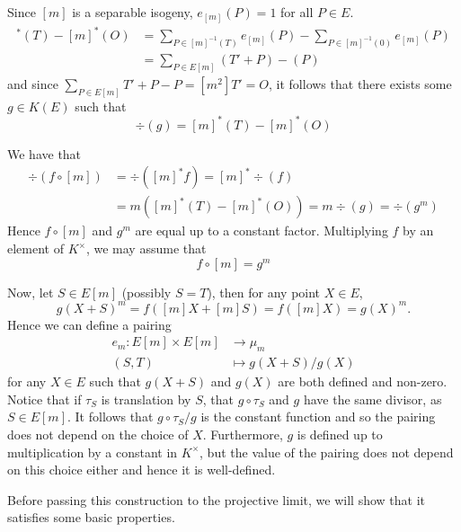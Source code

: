 Since $[m]$ is a separable isogeny, $e_{[m]}(P) = 1$ for all $P \in E$.
\begin{align*}
	[m]^*(T) - [m]^*(O) &= \sum_{P \in [m]^{-1}(T)}e_{[m]}(P) - \sum_{P \in
	[m]^{-1}(0)}e_{[m]}(P)\\
	&= \sum_{P \in E[m]}(T' + P) - (P)
\end{align*}
and since $\sum_{P \in E[m]} T' + P - P = [m^2]T' = O$, it follows that there
exists some $g \in K(E)$ such that
\begin{equation*}
	\div(g) = [m]^*(T) - [m]^*(O)
\end{equation*}

We have that
\begin{align*}
	\div(f\circ [m]) &= \div([m]^*f) = [m]^*\div(f) \\
	&= m\left([m]^*(T) - [m]^*(O)\right) = m\div(g) = \div(g^m)
\end{align*}
Hence $f\circ[m]$ and $g^m$ are equal up to a constant factor. Multiplying $f$
by an element of $K^\times$, we may assume that
\begin{equation*}
	f\circ [m] = g^m
\end{equation*}

Now, let $S \in E[m]$ (possibly $S = T$), then for any point $X \in E$,
\begin{equation*}
	g(X + S)^m = f([m]X + [m]S) = f([m]X) = g(X)^m.
\end{equation*}
Hence we can define a pairing
\begin{align*}
	e_m: E[m] \times E[m] &\to \mu_m\\
	(S, T) &\mapsto g(X + S)/g(X)
\end{align*}
for any $X \in E$ such that $g(X + S)$ and $g(X)$ are both defined and
non-zero. Notice that if $\tau_S$ is translation by $S$, that 
$g\circ \tau_S$ and $g$ have the same divisor, as $S \in E[m]$. It follows that 
$g\circ \tau_S/g$ is the constant function and so the pairing does not depend on
the choice of $X$. Furthermore, $g$ is defined up to multiplication by a
constant in $K^\times$, but the value of the pairing does not depend on this
choice either and hence it is well-defined.

Before passing this construction to the projective limit, we will show
that it satisfies some basic properties.


